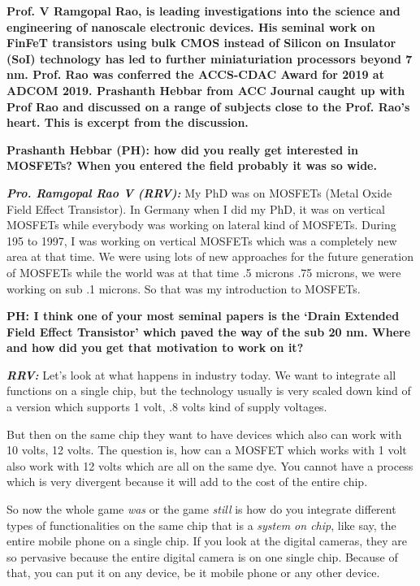 \begin{multicols}{2}

\textbf{Prof. V Ramgopal Rao, is leading investigations into the science and engineering of nanoscale electronic devices. His seminal work on FinFeT transistors using bulk  CMOS instead of Silicon on Insulator (SoI) technology has led to further miniaturiation processors beyond 7 nm. Prof. Rao was conferred the ACCS-CDAC Award for 2019 at ADCOM 2019. Prashanth Hebbar from ACC Journal caught up with Prof Rao and discussed on a range of subjects close to the Prof. Rao’s heart. This is excerpt from the discussion.}

\textbf{Prashanth Hebbar (PH): how did you really get interested in MOSFETs? When you entered the field probably it was so wide.}

\textbf{\textit {Pro. Ramgopal Rao V (RRV):}} My PhD was on MOSFETs (Metal Oxide Field Effect Transistor). In Germany when I did my PhD, it was on vertical MOSFETs while everybody was working on lateral kind of MOSFETs. During 195 to 1997, I was working on vertical MOSFETs which was a completely new area at that time. We were using lots of new approaches for the future generation of MOSFETs while the world was at that time .5 microns .75 microns, we were working on sub .1 microns. So that was my introduction to MOSFETs.

\textbf{PH:  I think one of your most seminal papers is the ‘Drain Extended Field Effect Transistor’ which paved the way of the sub 20 nm. Where and how did you get that motivation to work on it?}

\textbf{\textit {RRV:}} Let’s look at what happens in industry today. We want to integrate all functions on a single chip, but the technology usually is very scaled down kind of a version which supports 1 volt, .8 volts kind of supply voltages.

But then on the same chip they want to have devices which also can work with 10 volts, 12 volts. The question is, how can a MOSFET which works with 1 volt also work with 12 volts which are all on the same dye. You cannot have a process which is very divergent because it will add to the cost of the entire chip.

So now the whole game \textit{was} or the game \textit{still} is how do you integrate different types of functionalities on the same chip that is a \textit{system on chip}, like say, the entire mobile phone on a single chip. If you look at the digital cameras, they are so pervasive because the entire digital camera is on one single chip. Because of that, you can put it on any device, be it mobile phone or any other device.


\end{multicols}
